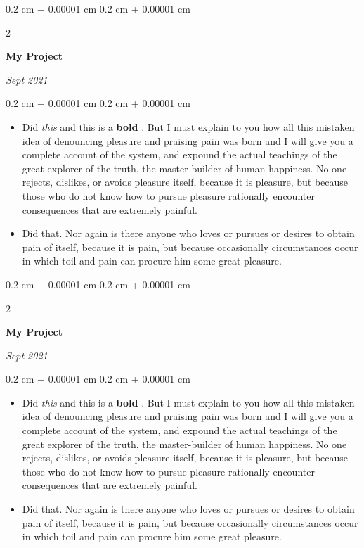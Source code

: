 \documentclass[10pt, letterpaper]{article}
\newenvironment{highlights}{
    \begin{itemize}[
        topsep=0.10 cm,
        parsep=0.10 cm,
        partopsep=0pt,
        itemsep=0pt,
        leftmargin=0.4 cm + 10pt
    ]
}{
    \end{itemize}
} %
\newenvironment{onecolentry}{
    \begin{adjustwidth}{
        0.2 cm + 0.00001 cm
    }{
        0.2 cm + 0.00001 cm
    }
}{
    \end{adjustwidth}
} %
\newenvironment{twocolentry}[2][]{
    \onecolentry
    \def\secondColumn{#2}
    \setcolumnwidth{\fill, 4.5 cm}
    \begin{paracol}{2}
}{
    \switchcolumn \raggedleft \secondColumn
    \end{paracol}
    \endonecolentry
} %
\let\hrefWithoutArrow\href
\renewcommand{\href}[2]{\hrefWithoutArrow{#1}{\ifthenelse{\equal{#2}{}}{ }{#2 }\raisebox{.15ex}{\footnotesize \faExternalLink*}}}
\begin{document}
        \vspace{0.2 cm}

        \begin{twocolentry}{
            
            
        \textit{Sept 2021}}
            \textbf{My Project}
        \end{twocolentry}

        \vspace{0.10 cm}
        \begin{onecolentry}
            \begin{highlights}
                \item Did \textit{this} and this is a \textbf{bold} \href{https://example.com}{link}. But I must explain to you how all this mistaken idea of denouncing pleasure and praising pain was born and I will give you a complete account of the system, and expound the actual teachings of the great explorer of the truth, the master-builder of human happiness. No one rejects, dislikes, or avoids pleasure itself, because it is pleasure, but because those who do not know how to pursue pleasure rationally encounter consequences that are extremely painful.
                \item Did that. Nor again is there anyone who loves or pursues or desires to obtain pain of itself, because it is pain, but because occasionally circumstances occur in which toil and pain can procure him some great pleasure.
            \end{highlights}
        \end{onecolentry}


        \vspace{0.2 cm}

        \begin{twocolentry}{
            
            
        \textit{Sept 2021}}
            \textbf{My Project}
        \end{twocolentry}

        \vspace{0.10 cm}
        \begin{onecolentry}
            \begin{highlights}
                \item Did \textit{this} and this is a \textbf{bold} \href{https://example.com}{link}. But I must explain to you how all this mistaken idea of denouncing pleasure and praising pain was born and I will give you a complete account of the system, and expound the actual teachings of the great explorer of the truth, the master-builder of human happiness. No one rejects, dislikes, or avoids pleasure itself, because it is pleasure, but because those who do not know how to pursue pleasure rationally encounter consequences that are extremely painful.
                \item Did that. Nor again is there anyone who loves or pursues or desires to obtain pain of itself, because it is pain, but because occasionally circumstances occur in which toil and pain can procure him some great pleasure.
            \end{highlights}
        \end{onecolentry}
\end{document}
